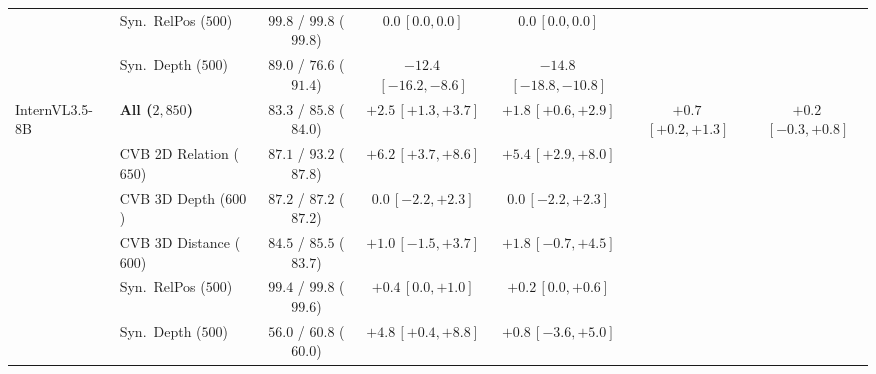 \begin{tabular}{@{}llccccc@{}}
 & Syn.\ RelPos ($500$) & $99.8$ / $99.8$ ($99.8$) & $0.0$\,{\scriptsize$[0.0, 0.0]$} & $0.0$\,{\scriptsize$[0.0, 0.0]$} & & \\
 & Syn.\ Depth ($500$) & $89.0$ / $76.6$ ($91.4$) & $-12.4$\,{\scriptsize$[-16.2, -8.6]$} & $-14.8$\,{\scriptsize$[-18.8, -10.8]$} & & \\
\midrule
InternVL3.5-8B & \textbf{All ($2{,}850$)} & $83.3$ / $85.8$ ($84.0$) & $+2.5$\,{\scriptsize$[+1.3, +3.7]$} & $+1.8$\,{\scriptsize$[+0.6, +2.9]$} & $+0.7$\,{\scriptsize$[+0.2, +1.3]$} & $+0.2$\,{\scriptsize$[-0.3, +0.8]$} \\
 & CVB 2D Relation ($650$) & $87.1$ / $93.2$ ($87.8$) & $+6.2$\,{\scriptsize$[+3.7, +8.6]$} & $+5.4$\,{\scriptsize$[+2.9, +8.0]$} & & \\
 & CVB 3D Depth ($600$) & $87.2$ / $87.2$ ($87.2$) & $0.0$\,{\scriptsize$[-2.2, +2.3]$} & $0.0$\,{\scriptsize$[-2.2, +2.3]$} & & \\
 & CVB 3D Distance ($600$) & $84.5$ / $85.5$ ($83.7$) & $+1.0$\,{\scriptsize$[-1.5, +3.7]$} & $+1.8$\,{\scriptsize$[-0.7, +4.5]$} & & \\
 & Syn.\ RelPos ($500$) & $99.4$ / $99.8$ ($99.6$) & $+0.4$\,{\scriptsize$[0.0, +1.0]$} & $+0.2$\,{\scriptsize$[0.0, +0.6]$} & & \\
 & Syn.\ Depth ($500$) & $56.0$ / $60.8$ ($60.0$) & $+4.8$\,{\scriptsize$[+0.4, +8.8]$} & $+0.8$\,{\scriptsize$[-3.6, +5.0]$} & & \\
\bottomrule
\end{tabular}
